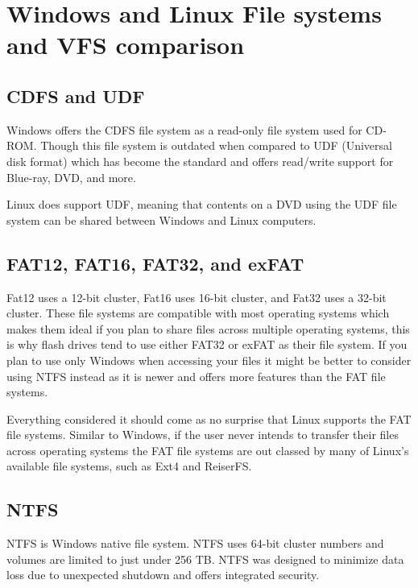 \documentclass[letterpaper, 10pt, onecolumn, draftclsnofoot]{IEEEtran}
\begin{document}
\section{Windows and Linux File systems and VFS comparison}

\subsection{CDFS and UDF}

Windows offers the CDFS file system as a read-only file system used for CD-ROM. Though this file system is outdated when compared to UDF (Universal disk format) which has become the standard and offers read/write support for Blue-ray, DVD, and more.\cite{wi_p2}

Linux does support UDF, meaning that contents on a DVD using the UDF file system can be shared between Windows and Linux computers.\cite{linux}

\subsection{FAT12, FAT16, FAT32, and exFAT}

Fat12 uses a 12-bit cluster, Fat16 uses 16-bit cluster, and Fat32 uses a 32-bit cluster. These file systems are compatible with most operating systems which makes them ideal if you plan to share files across multiple operating systems, this is why flash drives tend to use either FAT32 or exFAT as their file system. If you plan to use only Windows when accessing your files it might be better to consider using NTFS instead as it is newer and offers more features than the FAT file systems.\cite{wi_p2}

Everything considered it should come as no surprise that Linux supports the FAT file systems. Similar to Windows, if the user never intends to transfer their files across operating systems the FAT file systems are out classed by many of Linux's available file systems, such as Ext4 and ReiserFS.\cite{linux}

\subsection{NTFS}

NTFS is Windows native file system. NTFS uses 64-bit cluster numbers and volumes are limited to just under 256 TB. NTFS was designed to minimize data loss due to unexpected shutdown and offers integrated security.\cite{wi_p2}
\end{document}
